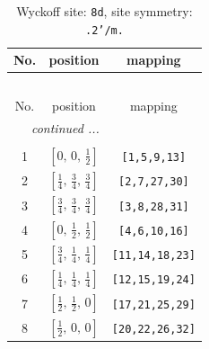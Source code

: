 \documentclass[fleqn,8pt]{jsarticle}
\begin{document}
\begin{longtable}{ccc}
\caption{Wyckoff site: {\tt 8d}, site symmetry: {\tt .2'/m.}}
 \\
 \hline \hline
No. & position & mapping \\ \hline \endfirsthead

\multicolumn{2}{l}{\tablename\ \thetable{}} \\
 \hline \hline
No. & position & mapping \\ \hline \endhead

 \hline \hline
\multicolumn{2}{r}{\footnotesize\it continued ...} \\ \endfoot

 \hline \hline
\multicolumn{2}{r}{} \\ \endlastfoot

1 & $\left[ 0,\, 0,\, \frac{1}{2} \right]$ & {\tt [1,5,9,13]} \\ \hline
2 & $\left[ \frac{1}{4},\, \frac{3}{4},\, \frac{3}{4} \right]$ & {\tt [2,7,27,30]} \\ \hline
3 & $\left[ \frac{3}{4},\, \frac{3}{4},\, \frac{3}{4} \right]$ & {\tt [3,8,28,31]} \\ \hline
4 & $\left[ 0,\, \frac{1}{2},\, \frac{1}{2} \right]$ & {\tt [4,6,10,16]} \\ \hline
5 & $\left[ \frac{3}{4},\, \frac{1}{4},\, \frac{1}{4} \right]$ & {\tt [11,14,18,23]} \\ \hline
6 & $\left[ \frac{1}{4},\, \frac{1}{4},\, \frac{1}{4} \right]$ & {\tt [12,15,19,24]} \\ \hline
7 & $\left[ \frac{1}{2},\, \frac{1}{2},\, 0 \right]$ & {\tt [17,21,25,29]} \\ \hline
8 & $\left[ \frac{1}{2},\, 0,\, 0 \right]$ & {\tt [20,22,26,32]} \\
\end{longtable}
\renewcommand{\arraystretch}{1.2}
\end{document}
